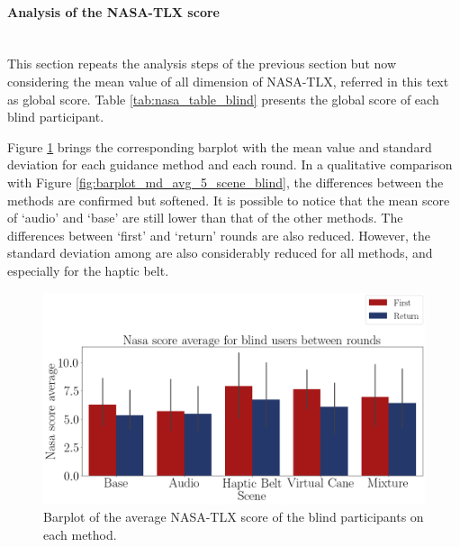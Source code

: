 

\FloatBarrier



\paragraph{Analysis of the NASA-TLX score}\mbox{}\\

This section repeats the analysis steps of the previous section but now considering the mean value of all dimension of NASA-TLX, referred in this text as global score. Table \ref{tab:nasa_table_blind} presents the global score of each blind participant. 



Figure \ref{fig:barplot_nasa_avg_5_scene_blind} brings the corresponding barplot with the mean value and standard deviation for each guidance method and each round. In a qualitative comparison with Figure \ref{fig:barplot_md_avg_5_scene_blind}, the differences between the methods are confirmed but softened. It is possible to notice that the mean score of ‘audio’ and ‘base’ are still lower than that of the other methods. The differences between ‘first’ and ‘return’ rounds are also reduced. However, the standard deviation among are also considerably reduced for all methods, and especially for the haptic belt.

\begin{figure}[!htb]
    \centering
    \includegraphics[width = 0.8\linewidth]{Resultados/Nasa/Figuras/png/barplot_nasa_avg_5_scene_blind.png}
    \caption{Barplot of the average NASA-TLX score of the blind participants on each method.}
    \label{fig:barplot_nasa_avg_5_scene_blind}
\end{figure}

